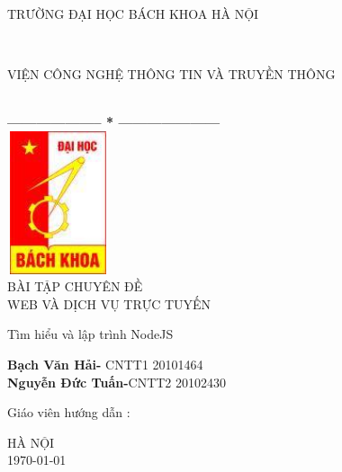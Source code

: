 \documentclass[a4paper,12pt]{report}
\begin{document}
\thispagestyle{empty}
\thisfancypage{
\setlength{\fboxsep}{0pt}
\fbox}{} 
\begin{center}
    \begin{large}
        \textcolor[rgb]{1.00,0.00,0.00}{TRƯỜNG ĐẠI HỌC BÁCH KHOA HÀ NỘI}
    \end{large} \\
    \begin{large}
        \textcolor[rgb]{1.00,0.00,0.00}{VIỆN CÔNG NGHỆ THÔNG TIN VÀ TRUYỀN THÔNG}
    \end{large} \\

    \textbf{--------------------  *  ---------------------}\\[2cm]

    \includegraphics[width=3cm, height=4.2cm]{logo}\\[1cm]
    {\fontsize{32pt}{1}\selectfont BÀI TẬP CHUYÊN ĐỀ}\\
    {\fontsize{20pt}{1}\selectfont WEB VÀ DỊCH VỤ TRỰC TUYẾN}\\[2cm]
\end{center}

\hspace{5cm}  Tìm hiểu và lập trình NodeJS
\begin{flushright}
    \parbox[t]{8cm}{
    \textbf{Bạch Văn Hải- }CNTT1 20101464\\
    \textbf{Nguyễn Đức Tuấn-}CNTT2 20102430\\
	}
\end{flushright}

\hspace{5cm} Giáo viên hướng dẫn\hspace{24pt} :
\begin{flushright} \textbf{\parbox[t]{8cm}{    
        \textcolor[rgb]{0.00,0.00,1.00}{Tạ Tuấn Anh}
        }}
\end{flushright}
    \vspace{2cm}
\begin{center}
        {\fontsize{16pt}{1}\selectfont HÀ NỘI}\\
        {\fontsize{16pt}{1}\today}
\end{center}
\end{document}
